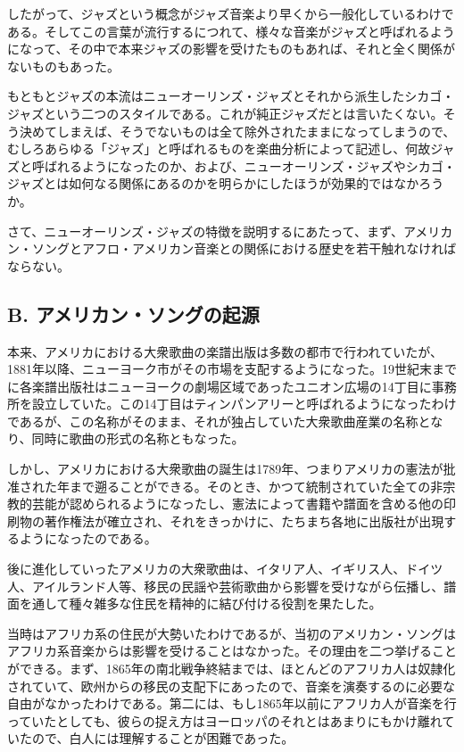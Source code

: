 したがって、ジャズという概念がジャズ音楽より早くから一般化しているわけである。そしてこの言葉が流行するにつれて、様々な音楽がジャズと呼ばれるようになって、その中で本来ジャズの影響を受けたものもあれば、それと全く関係がないものもあった。

もともとジャズの本流はニューオーリンズ・ジャズとそれから派生したシカゴ・ジャズという二つのスタイルである。これが純正ジャズだとは言いたくない。そう決めてしまえば、そうでないものは全て除外されたままになってしまうので、むしろあらゆる「ジャズ」と呼ばれるものを楽曲分析によって記述し、何故ジャズと呼ばれるようになったのか、および、ニューオーリンズ・ジャズやシカゴ・ジャズとは如何なる関係にあるのかを明らかにしたほうが効果的ではなかろうか。

さて、ニューオーリンズ・ジャズの特徴を説明するにあたって、まず、アメリカン・ソングとアフロ・アメリカン音楽との関係における歴史を若干触れなければならない。

\subsection{B. アメリカン・ソングの起源}

本来、アメリカにおける大衆歌曲の楽譜出版は多数の都市で行われていたが、1881年以降、ニューヨーク市がその市場を支配するようになった。19世紀末までに各楽譜出版社はニューヨークの劇場区域であったユニオン広場の14丁目に事務所を設立していた。この14丁目はティンパンアリーと呼ばれるようになったわけであるが、この名称がそのまま、それが独占していた大衆歌曲産業の名称となり、同時に歌曲の形式の名称ともなった。

しかし、アメリカにおける大衆歌曲の誕生は1789年、つまりアメリカの憲法が批准された年まで遡ることができる。そのとき、かつて統制されていた全ての非宗教的芸能が認められるようになったし、憲法によって書籍や譜面を含める他の印刷物の著作権法が確立され、それをきっかけに、たちまち各地に出版社が出現するようになったのである。

後に進化していったアメリカの大衆歌曲は、イタリア人、イギリス人、ドイツ人、アイルランド人等、移民の民謡や芸術歌曲から影響を受けながら伝播し、譜面を通して種々雑多な住民を精神的に結び付ける役割を果たした。

当時はアフリカ系の住民が大勢いたわけであるが、当初のアメリカン・ソングはアフリカ系音楽からは影響を受けることはなかった。その理由を二つ挙げることができる。まず、1865年の南北戦争終結までは、ほとんどのアフリカ人は奴隷化されていて、欧州からの移民の支配下にあったので、音楽を演奏するのに必要な自由がなかったわけである。第二には、もし1865年以前にアフリカ人が音楽を行っていたとしても、彼らの捉え方はヨーロッパのそれとはあまりにもかけ離れていたので、白人には理解することが困難であった。

